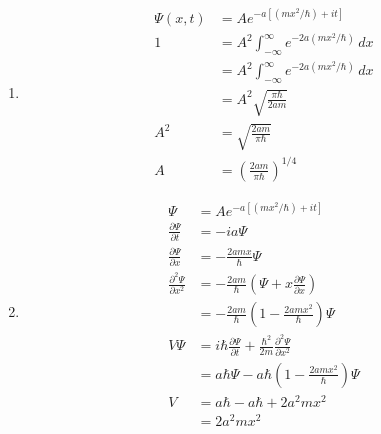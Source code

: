 \documentclass{article}
\begin{document}
\begin{enumerate}
  \item

        \begin{align*}
          \Psi(x, t) & = A e^{-a [(m x^2 / \hbar) + i t]}                         \\
          1          & = A^2 \int_{-\infty}^\infty e^{-2 a (m x^2 / \hbar)} \,d x \\
                     & = A^2 \int_{-\infty}^\infty e^{-2 a (m x^2 / \hbar)} \,d x \\
                     & = A^2 \sqrt{\frac{\pi \hbar}{2 a m}}                       \\
          A^2        & = \sqrt{\frac{2 a m}{\pi \hbar}}                           \\
          A          & = \left( \frac{2 a m}{\pi \hbar} \right)^{1 / 4}
        \end{align*}

  \item

        \begin{align*}
          \Psi                                 & = A e^{-a [(m x^2 / \hbar) + i t]}                                                                    \\
          \frac{\partial \Psi}{\partial t}     & = -i a \Psi                                                                                           \\
          \frac{\partial \Psi}{\partial x}     & = -\frac{2 a m x}{\hbar} \Psi                                                                         \\
          \frac{\partial^2 \Psi}{\partial x^2} & = -\frac{2 a m}{\hbar} \left( \Psi + x \frac{\partial \Psi}{\partial x} \right)                       \\
                                               & = -\frac{2 a m}{\hbar} \left( 1 - \frac{2 a m x^2}{\hbar} \right) \Psi                                \\
          V \Psi                               & = i \hbar \frac{\partial \Psi}{\partial t} + \frac{\hbar^2}{2 m} \frac{\partial^2 \Psi}{\partial x^2} \\
                                               & = a \hbar \Psi - a \hbar \left( 1 - \frac{2 a m x^2}{\hbar} \right) \Psi                              \\
          V                                    & = a \hbar - a \hbar + 2 a^2 m x^2                                                                     \\
                                               & = 2 a^2 m x^2
        \end{align*}


\end{enumerate}
\end{document}
